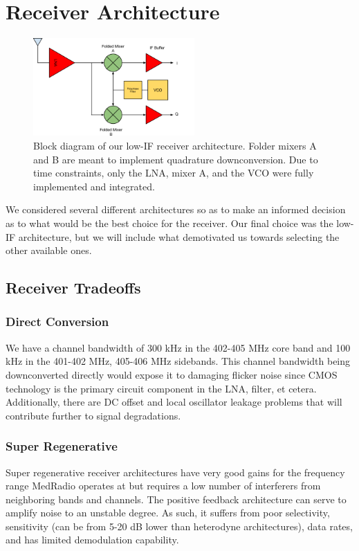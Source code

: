 \section{Receiver Architecture}

\begin{figure}[h]
   \centering
    \includegraphics[width=0.55\textwidth]{figures/receiver}
    \caption{
        Block diagram of our low-IF receiver architecture. Folder mixers A and B are meant to implement quadrature downconversion. Due to time constraints, only the LNA, mixer A, and the VCO were fully implemented and integrated.
    }
    \label{fig:receiver}
\end{figure}

We considered several different architectures so as to make an informed decision as to what would be the best choice for the receiver. Our final choice was the low-IF architecture, but we will include what demotivated us towards selecting the other available ones.


\subsection{Receiver Tradeoffs}
\subsubsection{Direct Conversion}
We have a channel bandwidth of 300 kHz in the 402-405 MHz core band and 100 kHz in the 401-402 MHz, 405-406 MHz sidebands. This channel bandwidth being downconverted directly would expose it to damaging flicker noise since CMOS technology is the primary circuit component in the LNA, filter, et cetera. Additionally, there are DC offset and local oscillator leakage problems that will contribute further to signal degradations.

\subsubsection{Super Regenerative}
Super regenerative receiver architectures have very good gains for the frequency range MedRadio operates at but requires a low number of interferers from neighboring bands and channels. The positive feedback architecture can serve to amplify noise to an unstable degree. As such, it suffers from poor selectivity, sensitivity (can be from 5-20 dB lower than heterodyne architectures), data rates, and has limited demodulation capability. 


